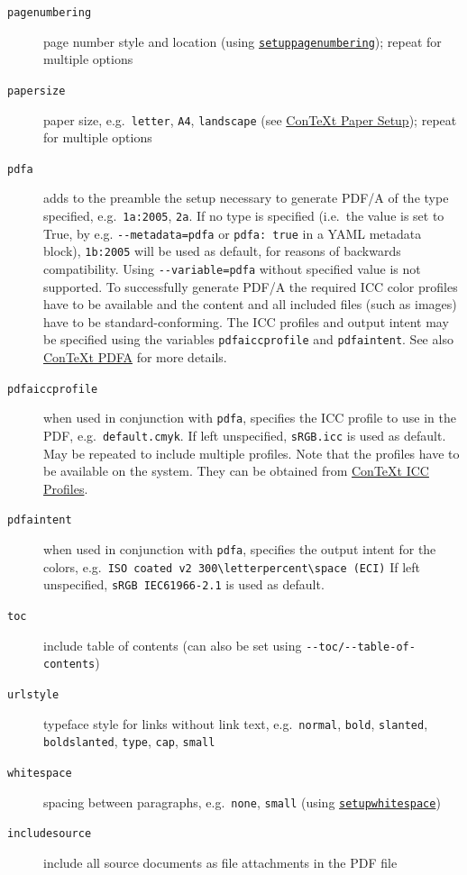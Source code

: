 \documentclass[
]{article}
\begin{document}
\begin{description}
\item[\texttt{pagenumbering}]
page number style and location (using
\href{https://wiki.contextgarden.net/Command/setuppagenumbering}{\texttt{setuppagenumbering}});
repeat for multiple options
\item[\texttt{papersize}]
paper size, e.g.~\texttt{letter}, \texttt{A4}, \texttt{landscape} (see
\href{https://wiki.contextgarden.net/Document_layout_and_layers/Paper_setup}{ConTeXt
Paper Setup}); repeat for multiple options
\item[\texttt{pdfa}]
adds to the preamble the setup necessary to generate PDF/A of the type
specified, e.g.~\texttt{1a:2005}, \texttt{2a}. If no type is specified
(i.e.~the value is set to True, by e.g. \texttt{-\/-metadata=pdfa} or
\texttt{pdfa:\ true} in a YAML metadata block), \texttt{1b:2005} will be
used as default, for reasons of backwards compatibility. Using
\texttt{-\/-variable=pdfa} without specified value is not supported. To
successfully generate PDF/A the required ICC color profiles have to be
available and the content and all included files (such as images) have
to be standard-conforming. The ICC profiles and output intent may be
specified using the variables \texttt{pdfaiccprofile} and
\texttt{pdfaintent}. See also
\href{https://wiki.contextgarden.net/Input_and_compilation/PDF/PDFA}{ConTeXt
PDFA} for more details.
\item[\texttt{pdfaiccprofile}]
when used in conjunction with \texttt{pdfa}, specifies the ICC profile
to use in the PDF, e.g.~\texttt{default.cmyk}. If left unspecified,
\texttt{sRGB.icc} is used as default. May be repeated to include
multiple profiles. Note that the profiles have to be available on the
system. They can be obtained from
\href{https://wiki.contextgarden.net/Input_and_compilation/PDF/PDFX\#ICC_profiles}{ConTeXt
ICC Profiles}.
\item[\texttt{pdfaintent}]
when used in conjunction with \texttt{pdfa}, specifies the output intent
for the colors,
e.g.~\texttt{ISO\ coated\ v2\ 300\textbackslash{}letterpercent\textbackslash{}space\ (ECI)}
If left unspecified, \texttt{sRGB\ IEC61966-2.1} is used as default.
\item[\texttt{toc}]
include table of contents (can also be set using
\texttt{-\/-toc/-\/-table-of-contents})
\item[\texttt{urlstyle}]
typeface style for links without link text, e.g.~\texttt{normal},
\texttt{bold}, \texttt{slanted}, \texttt{boldslanted}, \texttt{type},
\texttt{cap}, \texttt{small}
\item[\texttt{whitespace}]
spacing between paragraphs, e.g.~\texttt{none}, \texttt{small} (using
\href{https://wiki.contextgarden.net/Command/setupwhitespace}{\texttt{setupwhitespace}})
\item[\texttt{includesource}]
include all source documents as file attachments in the PDF file
\end{description}
\end{document}
